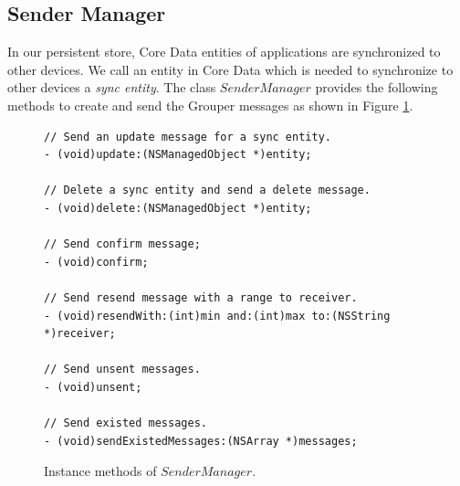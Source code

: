 \documentclass[a4paper,11pt]{report}
\begin{document}
\subsection{Sender Manager} \label{subsection:sender_manager}

In our persistent store, Core Data entities of applications are synchronized to other devices.
We call an entity in Core Data which is needed to synchronize to other devices a \emph{sync entity}.
The class $SenderManager$ provides the following methods to create and send the Grouper messages as shown in Figure \ref{fig:sender_manager}.

\begin{figure}
\begin{lstlisting}[frame=none language=Objective-C] 
// Send an update message for a sync entity.
- (void)update:(NSManagedObject *)entity;

// Delete a sync entity and send a delete message.
- (void)delete:(NSManagedObject *)entity;

// Send confirm message;
- (void)confirm;

// Send resend message with a range to receiver.
- (void)resendWith:(int)min and:(int)max to:(NSString *)receiver;

// Send unsent messages.
- (void)unsent;

// Send existed messages.
- (void)sendExistedMessages:(NSArray *)messages;	
\end{lstlisting}
\caption{Instance methods of $SenderManager$.}
\label{fig:sender_manager}
\end{figure}
\end{document}
